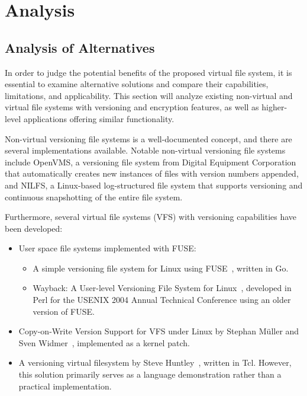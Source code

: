 \chapter{Analysis}
\label{chap:analysis}

\section{Analysis of Alternatives}\label{sec:alternatives}

In order to judge the potential benefits of the proposed virtual file system, it is essential to examine alternative solutions and compare their capabilities, limitations, and applicability.
This section will analyze existing non-virtual and virtual file systems with versioning and encryption features, as well as higher-level applications offering similar functionality.

Non-virtual versioning file systems is a well-documented concept, and there are several implementations available.
Notable non-virtual versioning file systems include OpenVMS, a versioning file system from Digital Equipment Corporation that automatically creates new instances of files with version numbers appended, and NILFS, a Linux-based log-structured file system that supports versioning and continuous snapshotting of the entire file system.

Furthermore, several virtual file systems (VFS) with versioning capabilities have been developed:

\begin{itemize}
    \item User space file systems implemented with FUSE:
    \begin{itemize}
        \item A simple versioning file system for Linux using FUSE~\cite{simple_vfs}, written in Go.
        \item Wayback: A User-level Versioning File System for Linux~\cite{wayback_vfs}, developed in Perl for the USENIX 2004 Annual Technical Conference using an older version of FUSE\@.
    \end{itemize}
    \item Copy-on-Write Version Support for VFS under Linux by Stephan Müller and Sven Widmer~\cite{vvfs}, implemented as a kernel patch.
    \item A versioning virtual filesystem by Steve Huntley~\cite{huntley_vvfs}, written in Tcl.
    However, this solution primarily serves as a language demonstration rather than a practical implementation.
\end{itemize}

